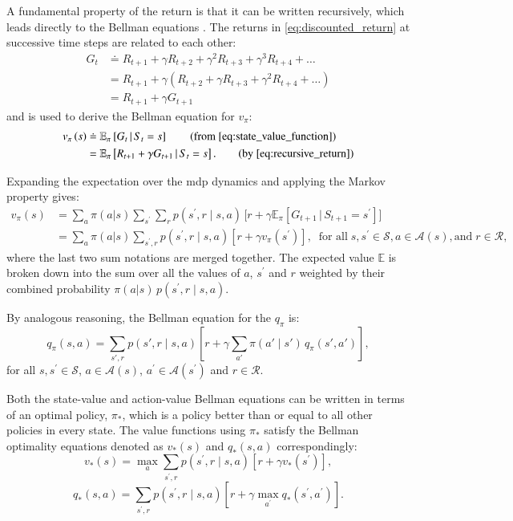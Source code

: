 A fundamental property of the return is that it can be written recursively, which leads directly to the Bellman equations \citep{bellmanDynamicProgramming1957}. The returns in \eqref{eq:discounted_return} at successive time steps are related to each other:
\begin{align}\label{eq:recursive_return}
	G_t &\doteq R_{t+1} + \gamma R_{t+2} + \gamma^{2} R_{t+3} + \gamma^{3} R_{t+4} + \dots \nonumber \\
	&=  R_{t+1} + \gamma \left(R_{t+2} + \gamma R_{t+3} + \gamma^{2} R_{t+4} + \dots \right) \nonumber \\
	&= R_{t+1} + \gamma G_{t+1}
\end{align}
and is used to derive the Bellman equation for $v_\pi$:
\begin{align*}
	v_\pi\left(s\right) &\doteq \mathbb{E}_\pi\left[G_t\,|\,S_t = s\right] \tag{from \ref{eq:state_value_function}}\\
	&= \mathbb{E}_\pi\left[R_{t+1} + \gamma G_{t+1}\,|\,S_t = s\right]. \tag{by \ref{eq:recursive_return}}
\end{align*}

Expanding the expectation over the \acrshort{mdp} dynamics and applying the Markov property gives:
\begin{align}
	v_\pi\left(s\right) &= \sum_{a} \pi(a|s) \sum_{s^{\prime}} \sum_{r}p(s^{\prime}, r\;|\;s, a)\,\bigg[r + \gamma \mathbb{E}_\pi\left[G_{t+1}\,|\,S_{t+1} = s^{\prime}\right] \bigg] \nonumber \\
	&= \sum_{a} \pi(a|s) \sum_{s^{\prime}, r} p(s^{\prime}, r\;|\;s, a) \left[r + \gamma v_\pi(s^{\prime})\right],\;\;\text{for all}\;s,s^{\prime} \in \mathcal{S}, a \in \mathcal{A}(s), \text{and}\;r \in \mathcal{R},
\end{align}
where the last two sum notations are merged together. The expected value $\mathbb{E}$ is broken down into the sum over all the values of $a$, $s^\prime$ and $r$ weighted by their combined probability $\pi(a|s)\,p(s^{\prime}, r\;|\;s, a)$.

By analogous reasoning, the Bellman equation for the $q_\pi$ is:
\begin{equation}
	q_\pi(s, a) = \sum_{s', r} p(s', r \mid s, a) \left[ r + \gamma \sum_{a'} \pi(a' \mid s') \, q_\pi(s', a') \right],
\end{equation}
for all $s,s^{\prime} \in \mathcal{S}$, $a \in \mathcal{A}(s)$, $a^{\prime} \in \mathcal{A}(s^{\prime})$ and $r \in \mathcal{R}$.

Both the state-value and action-value Bellman equations can be written in terms of an optimal policy, $\pi_*$, which is a policy better than or equal to all other policies in every state. The value functions using $\pi_*$ satisfy the Bellman optimality equations denoted as $v_*(s)$ and $q_*(s,a)$ correspondingly:
\begin{equation}
	v_*(s) = \max_{a} \sum_{s^{\prime}, r} p(s^{\prime}, r\;|\;s, a) \left[r + \gamma v_*(s^{\prime})\right],
\end{equation}
\begin{equation}
	q_*(s,a) = \sum_{s^{\prime}, r} p(s^{\prime}, r\;|\;s, a) \left[r + \gamma \max_{a^{\prime}}q_*(s^{\prime}, a^{\prime})\right].
\end{equation}

